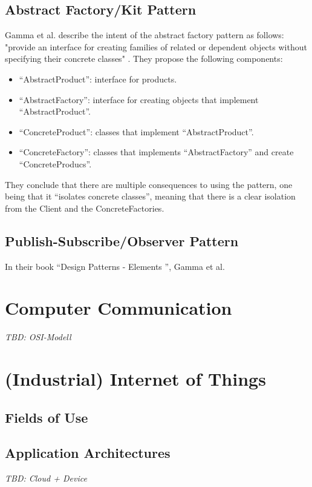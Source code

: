 \subsection{Abstract Factory/Kit Pattern}
Gamma et al. describe the intent of the abstract factory pattern as follows: "provide an interface for creating families of related or dependent objects without specifying their concrete classes" \cite{Gamma1998}. They propose the following components:
\begin{itemize}
    \item \enquote{AbstractProduct}: interface for products.
    \item \enquote{AbstractFactory}: interface for creating objects that implement \enquote{AbstractProduct}.
    \item \enquote{ConcreteProduct}: classes that implement \enquote{AbstractProduct}.
    \item \enquote{ConcreteFactory}: classes that implements \enquote{AbstractFactory} and create \enquote{ConcreteProducs}. 
\end{itemize}
They conclude that there are multiple consequences to using the pattern, one being that it \enquote{isolates concrete classes}, meaning that there is a clear isolation from the Client and the ConcreteFactories.
\subsection{Publish-Subscribe/Observer Pattern}
In their book \enquote{Design Patterns - Elements }, Gamma et al.
\section{Computer Communication}
\label{sec:computer-networks}
\emph{TBD: OSI-Modell} %

\section{(Industrial) Internet of Things}
\label{sec:internet-of-things}
\subsection{Fields of Use}
\subsection{Application Architectures}
\emph{TBD: Cloud + Device}
